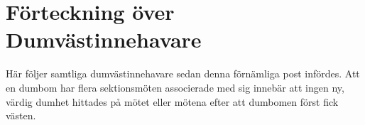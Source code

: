 \documentclass[a4paper]{article}
\begin{document}
\section{Förteckning över Dumvästinnehavare}

Här följer samtliga dumvästinnehavare sedan denna förnämliga post infördes. Att en dumbom har flera sektionsmöten associerade med sig innebär att ingen ny, värdig dumhet hittades på mötet eller mötena efter att dumbomen först fick västen.

\renewcommand{\cellalign}{tl}
\renewcommand*{\arraystretch}{1.8}
\end{document}

